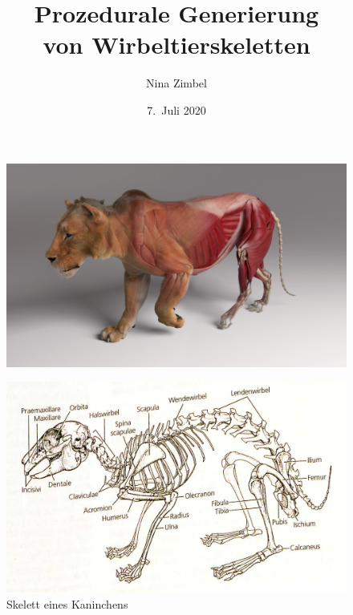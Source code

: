 \documentclass{beamer}
\title{Prozedurale Generierung\\ von Wirbeltierskeletten}
\author{Nina Zimbel}
\institute{KIT -- Institut für Visualisierung und Datenanalyse}
\date{7.\ Juli 2020}
\begin{document}
\begin{frame}
 \maketitle
\end{frame}

\begin{frame}[plain]
 \centering
 \begin{figure}
  \includegraphics[width=\textwidth]{graphics/ziva-post2.jpg}
 \end{figure}
\end{frame}

\begin{frame}[plain]
 \begin{figure}
  \centering
  \includegraphics[width=\textwidth]{graphics/kaninchen.jpg}
  \caption{Skelett eines Kaninchens \cite{Spezielle_Zoologie}}
 \end{figure}
\end{frame}
\end{document}
